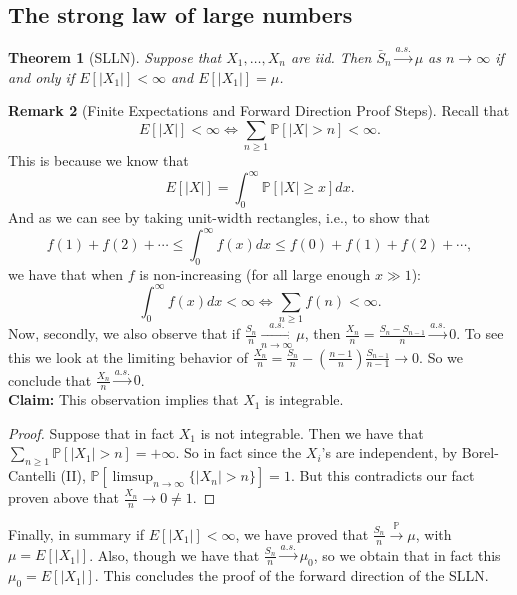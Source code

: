\documentclass[12pt,reqno]{article}
\theoremstyle{plain}
\newtheorem{theorem}{Theorem}[section]
\theoremstyle{definition}
\newtheorem{remark}[theorem]{Remark}
\begin{document}
\subsection{The strong law of large numbers} 

\begin{theorem}[SLLN]
Suppose that $X_1,\ldots,X_n$ are iid. Then $\bar{S}_n \xrightarrow{a.s.} \mu$ as 
$n \rightarrow \infty$ if and only if $E[|X_1|] < \infty$ and $E[|X_1|] = \mu$. 
\end{theorem} 

\begin{remark}[Finite Expectations and Forward Direction Proof Steps]
Recall that 
\[
E[|X|] < \infty \iff \sum_{n \geq 1} \mathbb{P}[|X| > n] < \infty.
\]
This is because we know that 
\[
E[|X|] = \int_0^{\infty} \mathbb{P}[|X| \geq x] dx. 
\]
And as we can see by taking unit-width rectangles, i.e., to show that 
\[
f(1)+f(2)+\cdots \leq \int_0^{\infty} f(x) dx \leq f(0)+f(1)+f(2)+\cdots,
\]
we have that when $f$ is non-increasing (for all large enough $x \gg 1$):
\[
\int_0^{\infty} f(x) dx < \infty \iff \sum_{n \geq 1} f(n) < \infty.
\]
Now, secondly, we also observe that if 
$\frac{S_n}{n} \xrightarrow[n \rightarrow \infty]{a.s.} \mu$, then 
$\frac{X_n}{n} = \frac{S_n-S_{n-1}}{n} \xrightarrow{a.s.} 0$. To see this we 
look at the limiting behavior of 
$\frac{X_n}{n} = \frac{S_n}{n} - \left(\frac{n-1}{n}\right) \frac{S_{n-1}}{n-1} 
 \longrightarrow 0$. So we conclude that $\frac{X_n}{n} \xrightarrow{a.s.} 0$. \\ 
\textbf{Claim:} This observation implies that $X_1$ is integrable. 
\begin{proof}
Suppose that in fact $X_1$ is not integrable. Then we have that 
$\sum_{n \geq 1} \mathbb{P}[|X_1| > n] = +\infty$. So in fact since the 
$X_i$'s are independent, by Borel-Cantelli (II), 
$\mathbb{P}\left[\limsup_{n \rightarrow \infty} \{|X_n| > n\}\right] = 1$. 
But this contradicts our fact proven above that $\frac{X_n}{n} \rightarrow 0 \neq 1$. 
\end{proof} 
Finally, in summary if $E[|X_1|] < \infty$, we have proved that 
$\frac{S_n}{n} \xrightarrow{\mathbb{P}} \mu$, with $\mu = E[|X_1|]$. 
Also, though we have that $\frac{S_n}{n} \xrightarrow{a.s.} \mu_0$, so we obtain that 
in fact this $\mu_0 = E[|X_1|]$. This concludes the proof of the forward direction of the 
SLLN.
\end{remark} 
\end{document}
